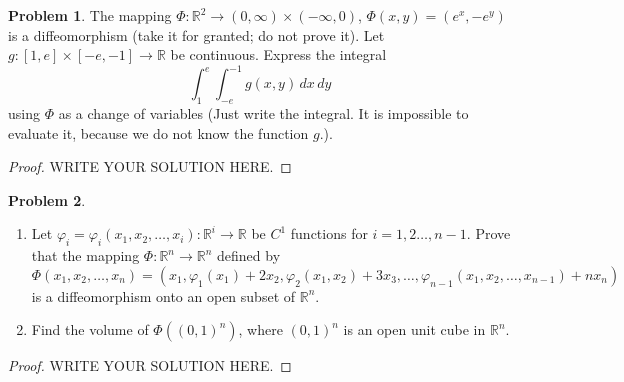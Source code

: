 \documentclass[11pt]{article}
\theoremstyle{definition}
\newtheorem{problem}{Problem}
\theoremstyle{definition}
\begin{document}
\begin{problem}
The mapping $\Phi:\mathbb{R}^2\to (0,\infty)\times (-\infty,0)$, $\Phi(x,y) = (e^x,-e^y)$ is a diffeomorphism (take it for granted; do not prove it).
Let $g:[1,e]\times [-e,-1]\to\mathbb{R}$ be continuous. Express the integral
$$ \int_1^e\int_{-e}^{-1} g(x,y)\, dx\, dy $$
using $\Phi$ as a change of variables (Just write the integral. It is impossible to evaluate it, because we do not know the function $g$.).
\end{problem}

\begin{proof}
	WRITE YOUR SOLUTION HERE.
\end{proof}


\medskip

\begin{problem}
~\begin{enumerate}[label=(\alph*)]
    \item Let $\varphi_i=\varphi_i(x_1,x_2,\ldots,x_i):\mathbb{R}^i\to\mathbb{R}$ be $C^1$ functions for $i=1,2\ldots, n-1$. Prove that the mapping $\Phi:\mathbb{R}^n\to\mathbb{R}^n$ defined by
    $$ \Phi(x_1,x_2,\ldots,x_n) = (x_1,\varphi_1(x_1)+2x_2, \varphi_2(x_1,x_2)+3x_3,\ldots, \varphi_{n-1}(x_1,x_2,\ldots,x_{n-1})+nx_n) $$
    is a diffeomorphism onto an open subset of $\mathbb{R}^n$.
    
    \item Find the volume of $\Phi((0,1)^n)$, where $(0,1)^n$ is an open unit cube in $\mathbb{R}^n$.
\end{enumerate}
\end{problem}
\begin{proof}
	WRITE YOUR SOLUTION HERE.
\end{proof}



\medskip
\end{document}
